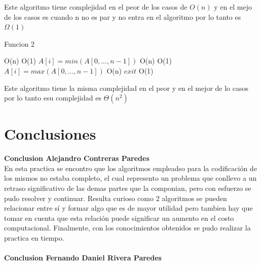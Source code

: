 \documentclass[12pt,twoside]{article}
\begin{document}
Este algoritmo tiene complejidad en el peor de los casos de $O(n)$ y en el mejo de los casos es cuando n no es par y no entra en el algoritmo por lo tanto es $\Omega (1)$
\newpage
\begin{algorithm}
\caption{Funcion 2}\label{euclid}
  \begin{algorithmic}[2]
     \Comment O(n)
      \Comment O(1) 
        \State $A[i]=min(A[0,...,n-1])$ \Comment O(n) 
       \Comment O(1) 
        \State$A[i]=max(A[0,...,n-1])$ \Comment O(n) 
      \Else
        \State \textbf{$exit$} \Comment O(1) 
      \EndIf
    \EndFor
  \EndFunction
  \end{algorithmic}
\end{algorithm}

Este algoritmo tiene la misma complejidad en el peor y en el mejor de lo casos por lo tanto esu complejidad es $\Theta (n^2)$



\newpage
\section{Conclusiones}
\textbf{Conclusion Alejandro Contreras Paredes}\\
En esta practica se encontro que los algoritmos empleadso para la codificaci\'on de los mismos no estaba completo, el cual represento un problema
que conllevo a un retraso significativo de las demas partes que la componian, pero con esfuerzo se pudo resolver y continuar.
Resulta curioso como 2 algoritmos se pueden relacionar entre s\'i y formar algo que es de mayor utilidad pero tambien hay que tomar en cuenta 
que esta relaci\'on puede significar un aumento en el costo computacional. Finalmente, con los conocimientos obtenidos se pudo realizar la practica en tiempo.
\\\\
\textbf{Conclusion Fernando Daniel Rivera Paredes}\\
\end{document}
